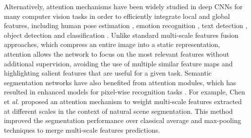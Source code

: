 \documentclass[journal]{IEEEtran}
\begin{document}






Alternatively, attention mechanisms have been widely studied in deep CNNs for many computer vision tasks in order to efficiently integrate local and global features, including human pose estimation \cite{chu2017multi}, emotion recognition \cite{gupta2018attention}, text detection \cite{huang2019mask}, object detection \cite{chen2018reverse} and classification \cite{li2018tell}. Unlike standard multi-scale features fusion approaches, which compress an entire image into a static representation, attention allows the network to focus on the most relevant features without additional supervision, avoiding the use of multiple similar feature maps and highlighting salient features that are useful for a given task. Semantic segmentation networks have also benefited from attention modules, which has resulted in enhanced models for pixel-wise recognition tasks \cite{chen2016attention,zhao2018psanet,fu2018dual,li2018pyramid,yu2018bisenet,zhang2019deep}. For example, Chen et \textit{al.} \cite{chen2016attention} proposed an attention mechanism to weight multi-scale features extracted at different scales in the context of natural scene segmentation. This method improved the segmentation performance over classical average and max-pooling techniques to merge multi-scale features predictions.
\end{document}
